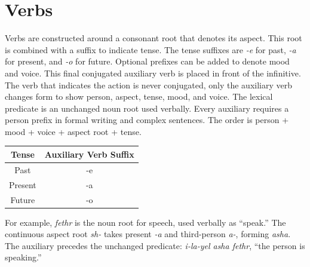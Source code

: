 \section*{Verbs}

Verbs are constructed around a consonant root that denotes its aspect. This root is combined with a suffix to indicate tense. The tense suffixes are \textit{-e} for past,\textit{ -a} for present, and \textit{-o} for future. Optional prefixes can be added to denote mood and voice. This final conjugated auxiliary verb is placed in front of the infinitive. The verb that indicates the action is never conjugated, only the auxiliary verb changes form to show person, aspect, tense, mood, and voice. The lexical predicate is an unchanged noun root used verbally. Every auxiliary requires a person prefix in formal writing and complex sentences. The order is person + mood + voice + aspect root + tense.

\begin{table}[H]
    \centering
    \begin{tabular}{|c|c|}
        \hline
        \textbf{Tense} & \textbf{Auxiliary Verb Suffix} \\
        \hline
        Past & -e \\
        Present & -a \\
        Future & -o \\
        \hline
    \end{tabular}
    \label{tab:verb-tense}
\end{table}


For example, \textit{fethr} is the noun root for speech, used verbally as ``speak.'' The continuous aspect root \textit{sh-} takes present \textit{-a} and third-person \textit{a-}, forming \textit{asha}. The auxiliary precedes the unchanged predicate: \textit{i-la-yel asha fethr}, ``the person is speaking.''

